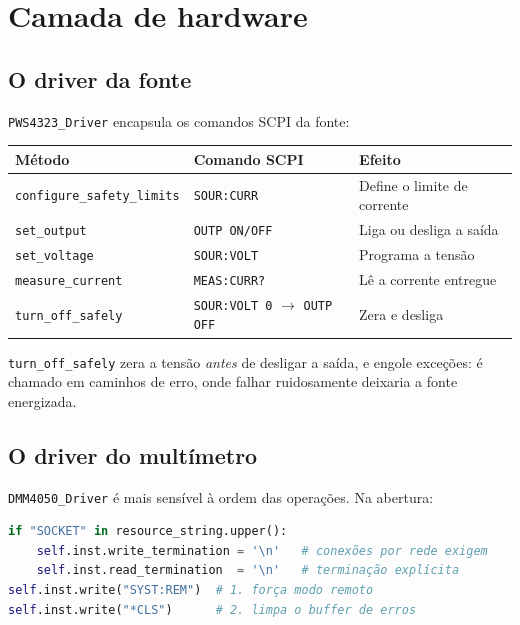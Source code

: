 \documentclass[11pt,a4paper]{article}
\newcommand{\classe}[1]{\texttt{#1}}
\begin{document}
\section{Camada de hardware}

\subsection{O driver da fonte}

\classe{PWS4323\_Driver} encapsula os comandos SCPI da fonte:

\begin{center}
\begin{tabular}{@{}llp{6.6cm}@{}}
\toprule
\textbf{Método} & \textbf{Comando SCPI} & \textbf{Efeito} \\
\midrule
\texttt{configure\_safety\_limits} & \texttt{SOUR:CURR} & Define o limite de corrente \\
\texttt{set\_output} & \texttt{OUTP ON/OFF} & Liga ou desliga a saída \\
\texttt{set\_voltage} & \texttt{SOUR:VOLT} & Programa a tensão \\
\texttt{measure\_current} & \texttt{MEAS:CURR?} & Lê a corrente entregue \\
\texttt{turn\_off\_safely} & \texttt{SOUR:VOLT 0} $\to$ \texttt{OUTP OFF} & Zera e desliga \\
\bottomrule
\end{tabular}
\end{center}

\texttt{turn\_off\_safely} zera a tensão \emph{antes} de desligar a saída, e
engole exceções: é chamado em caminhos de erro, onde falhar ruidosamente
deixaria a fonte energizada.

\subsection{O driver do multímetro}

\classe{DMM4050\_Driver} é mais sensível à ordem das operações. Na abertura:

\begin{lstlisting}[language=Python]
if "SOCKET" in resource_string.upper():
    self.inst.write_termination = '\n'   # conexões por rede exigem
    self.inst.read_termination  = '\n'   # terminação explícita
self.inst.write("SYST:REM")  # 1. força modo remoto
self.inst.write("*CLS")      # 2. limpa o buffer de erros
\end{lstlisting}
\end{document}
